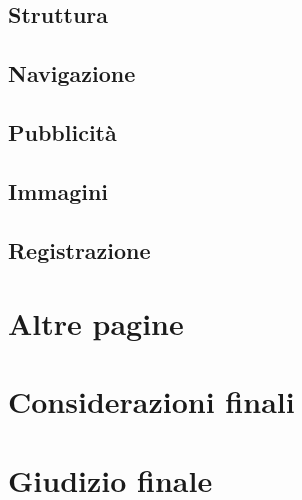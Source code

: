 \documentclass[11pt,a4paper]{article}
\begin{document}
\subsection{Struttura}
\label{subsec:structure}

\subsection{Navigazione}
\label{subsec:navigation}

\subsection{Pubblicità}
\label{subsec:ads}

\subsection{Immagini}
\label{subsec:images}

\subsection{Registrazione}
\label{subsec:signup}

\section{Altre pagine}
\label{sec:other-pages}

\section{Considerazioni finali}
\label{sec:final-remarks}

\section{Giudizio finale}
\label{sec:final-vote}
\end{document}
